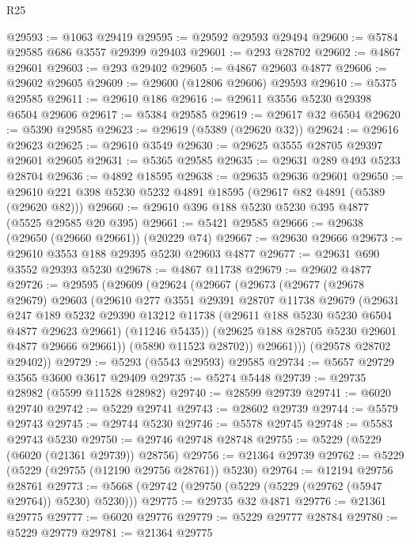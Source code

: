 \begin{lexlean}{R25}
\begin{coremodule}
@29593 := @1063 @29419
@29595 := @29592 @29593 @29494
@29600 := @5784 @29585 @686 @3557 @29399 @29403
@29601 := @293 @28702
@29602 := @4867 @29601
@29603 := @293 @29402
@29605 := @4867 @29603 @4877
@29606 := @29602 @29605
@29609 := @29600 (@12806 @29606) @29593
@29610 := @5375 @29585
@29611 := @29610 @186
@29616 := @29611 @3556 @5230 @29398 @6504 @29606
@29617 := @5384 @29585
@29619 := @29617 @32 @6504
@29620 := @5390 @29585
@29623 := @29619 (@5389 (@29620 @32))
@29624 := @29616 @29623
@29625 := @29610 @3549
@29630 := @29625 @3555 @28705 @29397 @29601 @29605
@29631 := @5365 @29585
@29635 := @29631 @289 @493 @5233 @28704
@29636 := @4892 @18595
@29638 := @29635 @29636 @29601
@29650 := @29610 @221 @398 @5230 @5232 @4891 @18595 (@29617 @82 @4891 (@5389 (@29620 @82)))
@29660 := @29610 @396 @188 @5230 @5230 @395 @4877 (@5525 @29585 @20 @395)
@29661 := @5421 @29585
@29666 := @29638 (@29650 (@29660 @29661)) (@20229 @74)
@29667 := @29630 @29666
@29673 := @29610 @3553 @188 @29395 @5230 @29603 @4877
@29677 := @29631 @690 @3552 @29393 @5230
@29678 := @4867 @11738
@29679 := @29602 @4877
@29726 := @29595
    (@29609
      (@29624
        (@29667
          (@29673
            (@29677
              (@29678 @29679)
              @29603
              (@29610
                @277
                @3551
                @29391
                @28707
                @11738
                @29679
                (@29631
                  @247
                  @189
                  @5232
                  @29390
                  @13212
                  @11738
                  (@29611 @188 @5230 @5230 @6504 @4877 @29623 @29661)
                  (@11246 @5435))
                (@29625 @188 @28705 @5230 @29601 @4877 @29666 @29661))
              (@5890 @11523 @28702))
            @29661)))
      (@29578 @28702 @29402))
@29729 := @5293 (@5543 @29593) @29585
@29734 := @5657 @29729 @3565 @3600 @3617 @29409
@29735 := @5274 @5448
@29739 := @29735 @28982 (@5599 @11528 @28982)
@29740 := @28599 @29739
@29741 := @6020 @29740
@29742 := @5229 @29741
@29743 := @28602 @29739
@29744 := @5579 @29743
@29745 := @29744 @5230
@29746 := @5578 @29745
@29748 := @5583 @29743 @5230
@29750 := @29746 @29748 @28748
@29755 := @5229 (@5229 (@6020 (@21361 @29739)) @28756)
@29756 := @21364 @29739
@29762 := @5229 (@5229 (@29755 (@12190 @29756 @28761)) @5230)
@29764 := @12194 @29756 @28761
@29773 := @5668 (@29742 (@29750 (@5229 (@5229 (@29762 (@5947 @29764)) @5230) @5230)))
@29775 := @29735 @32 @4871
@29776 := @21361 @29775
@29777 := @6020 @29776
@29779 := @5229 @29777 @28784
@29780 := @5229 @29779
@29781 := @21364 @29775

\end{coremodule}
\end{lexlean}
